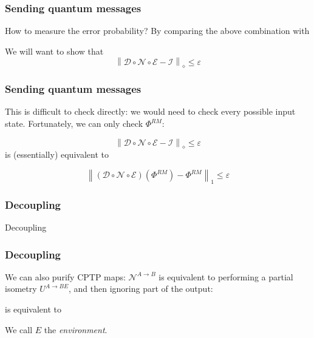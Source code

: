 \documentclass[12pt]{beamer}
\begin{document}
\begin{frame}
\frametitle{Sending quantum messages}
    \begin{figure}
    \scalebox{1}{}
    \end{figure}
How to measure the error probability? By comparing the above combination with
    \begin{figure}
    \scalebox{1}{}
    \end{figure}

We will want to show that
\[ \left\| \mathcal{D} \circ \mathcal{N} \circ \mathcal{E} - \mathcal{I} \right\|_{\diamond} \leqslant \varepsilon \]
\end{frame}

\begin{frame}
\frametitle{Sending quantum messages}
This is difficult to check directly: we would need to check every possible input state. Fortunately, we can only check $\Phi^{RM}$:
    \begin{figure}
    \scalebox{0.8}{}
    \end{figure}
\[ \left\| \mathcal{D} \circ \mathcal{N} \circ \mathcal{E} - \mathcal{I} \right\|_{\diamond} \leqslant \varepsilon \]
is (essentially) equivalent to  \vspace{-0.5cm}
    \begin{figure}
    \scalebox{0.8}{}
    \end{figure}
\vspace{-0.5cm}
\[ \left\| (\mathcal{D} \circ \mathcal{N} \circ \mathcal{E})(\Phi^{RM}) - \Phi^{RM} \right\|_1 \leqslant \varepsilon \]
\end{frame}


\begin{frame}
\frametitle{Decoupling}
	\begin{center}
		\Huge Decoupling
	\end{center}
\end{frame}

\begin{frame}
\frametitle{Decoupling}
We can also purify CPTP maps: $\mathcal{N}^{A \rightarrow B}$ is equivalent to performing a partial isometry $U^{A \rightarrow BE}$, and then ignoring part of the output:
    \begin{figure}
    \scalebox{0.9}{}
    \end{figure}
is equivalent to
    \begin{figure}
    \scalebox{0.9}{}
    \end{figure}
\vspace{-0.5cm}We call $E$ the \emph{environment}.
\end{frame}
\end{document}
